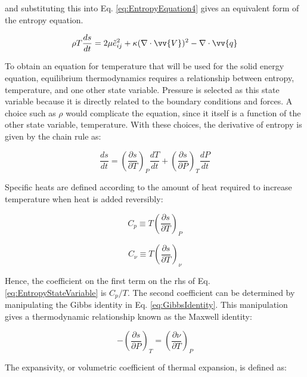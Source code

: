 \documentclass[10pt]{article}
\numberwithin{equation}{section} %
\begin{document}
and substituting this into Eq. \eqref{eq:EntropyEquation4} gives an equivalent form of the entropy equation.

\begin{equation}
\label{eq:EntropyEquation5}
\rho T\frac{ds}{dt}=2\mu \tilde{e}_{ij}^2+\kappa(\nabla\cdot\vv{V})^2-\nabla\cdot\vv{q}
\end{equation}

To obtain an equation for temperature that will be used for the solid energy equation, equilibrium thermodynamics requires a relationship between entropy, temperature, and one other state variable. Pressure is selected as this state variable because it is directly related to the boundary conditions and forces. A choice such as \(\rho\) would complicate the equation, since it itself is a function of the other state variable, temperature. With these choices, the derivative of entropy is given by the chain rule as:

\begin{equation}
\label{eq:EntropyStateVariable}
\frac{ds}{dt}=\left(\frac{\partial s}{\partial T}\right)_P\frac{dT}{dt}+\left(\frac{\partial s}{\partial P}\right)_T\frac{dP}{dt}
\end{equation}

Specific heats are defined according to the amount of heat required to increase temperature when heat is added reversibly: 

\begin{equation}
\label{eq:CpDef}
C_p\equiv T\left(\frac{\partial s}{\partial T}\right)_P
\end{equation}

\begin{equation}
\label{eq:CvDef}
C_\nu\equiv T\left(\frac{\partial s}{\partial T}\right)_\nu
\end{equation}

Hence, the coefficient on the first term on the \gls{rhs} of Eq. \eqref{eq:EntropyStateVariable} is \(C_p/T\). The second coefficient can be determined by manipulating the Gibbs identity in Eq. \eqref{eq:GibbsIdentity}. This manipulation gives a thermodynamic relationship known as the Maxwell identity:

\begin{equation}
\label{eq:entropy_volume}
-\left(\frac{\partial s}{\partial P}\right)_T=\left(\frac{\partial \nu}{\partial T}\right)_P
\end{equation}

The expansivity, or volumetric coefficient of thermal expansion, is defined as:
\end{document}
